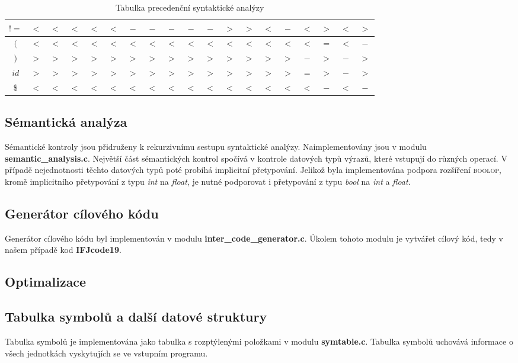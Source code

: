 \documentclass[12pt]{article}
\begin{document}
\begin{table}[!htbp]
\begin{tabular}{|c|c|c|c|c|c|c|c|c|c|c|c|c|c|c|c|c|c|c|}
    \hline
        $!=$ & $<$ & $<$ & $<$ & $<$ & $<$ & $-$ & $-$ & $-$ & $-$ & $-$ & $>$ & $>$ & $<$ & $-$ & $<$ & $>$ & $<$ & $>$\\
    \hline
        $($ & $<$ & $<$ & $<$ & $<$ & $<$ & $<$ & $<$ & $<$ & $<$ & $<$ & $<$ & $<$ & $<$ & $<$ & $<$ & $=$ & $<$ & $-$\\
    \hline
        $)$ & $>$ & $>$ & $>$ & $>$ & $>$ & $>$ & $>$ & $>$ & $>$ & $>$ & $>$ & $>$ & $>$ & $>$ & $-$ & $>$ & $-$ & $>$\\
    \hline
        $id$ & $>$ & $>$ & $>$ & $>$ & $>$ & $>$ & $>$ & $>$ & $>$ & $>$ & $>$ & $>$ & $>$ & $>$ & $=$ & $>$ & $-$ & $>$\\
    \hline
        $\$$ & $<$ & $<$ & $<$ & $<$ & $<$ & $<$ & $<$ & $<$ & $<$ & $<$ & $<$ & $<$ & $<$ & $<$ & $<$ & $-$ & $<$ & $-$\\
    \hline
    \end{tabular}
    \caption{Tabulka precedenční syntaktické analýzy}
    \label{tab:3}
\end{table}

\subsection{Sémantická analýza}
Sémantické kontroly jsou přidruženy k rekurzivnímu sestupu syntaktické analýzy.
Naimplementovány jsou v modulu \textbf{semantic\_analysis.c}. Největší část sémantických kontrol spočívá v kontrole datových typů výrazů, které vstupují do různých operací. V případě nejednotnosti těchto datových typů poté probíhá implicitní přetypování. Jelikož byla implementována podpora rozšíření \textsc{boolop}, kromě implicitního přetypování z typu \emph{int} na \emph{float}, je nutné podporovat i přetypování z typu \emph{bool} na \emph{int} a \emph{float}.

\subsection{Generátor cílového kódu}
Generátor cílového kódu byl implementován v modulu \textbf{inter\_code\_generator.c}. Úkolem tohoto modulu je vytvářet cílový kód, tedy v našem případě kod \textbf{IFJcode19}.
\subsection{Optimalizace}
\subsection{Tabulka symbolů a další datové struktury}
Tabulka symbolů je implementována jako tabulka s rozptýlenými položkami v modulu \textbf{symtable.c}. Tabulka symbolů uchovává informace o všech jednotkách vyskytujích se ve vstupním programu. 
\end{document}
